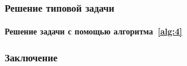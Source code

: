 \documentclass[ignorenonframetext,hyperref={pdftex,unicode},compress]{beamer}
\begin{document}
\begin{frame}
	\frametitle{Решение типовой задачи}
	\framesubtitle{Решение задачи с помощью алгоритма~\ref{alg:4}}
    
    \begin{figure}\center
        
        \label{fig:alg4}
    \end{figure}
\end{frame}



\begin{frame}
	\frametitle{Заключение}
    
    \begin{enumerate}

    \end{enumerate}
\end{frame}
\end{document}
